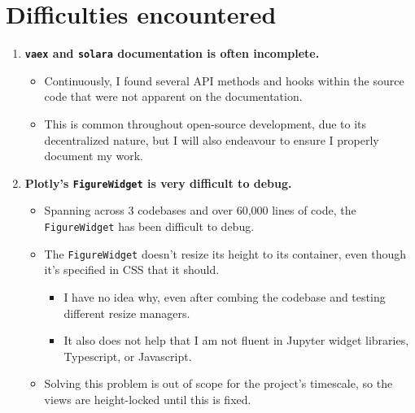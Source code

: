 \documentclass[a4paper,10pt,twocolumn]{article}
\begin{document}
\section{Difficulties encountered}
\begin{enumerate}
	\item \textbf{\texttt{vaex} and \texttt{solara} documentation is often incomplete.}
	      \begin{itemize}
		      \item Continuously, I found several API methods and hooks within the source code that were not apparent on the documentation.
		      \item This is common throughout open-source development, due to its decentralized nature, but I will also endeavour to ensure I properly document my work.
	      \end{itemize}
	      \item\textbf{Plotly's \texttt{FigureWidget} is very difficult to debug.}
	      \begin{itemize}
		      \item Spanning across 3 codebases and over 60,000 lines of code, the \texttt{FigureWidget} has been difficult to debug.
		      \item The \texttt{FigureWidget} doesn't resize its height to its container, even though it's specified in CSS that it should.
		            \begin{itemize}
			            \item I have no idea why, even after combing the codebase and testing different resize managers.
			            \item It also does not help that I am not fluent in Jupyter widget libraries, Typescript, or Javascript.
		            \end{itemize}
		      \item Solving this problem is out of scope for the project's timescale, so the views are height-locked until this is fixed.
	      \end{itemize}
\end{enumerate}
\end{document}
